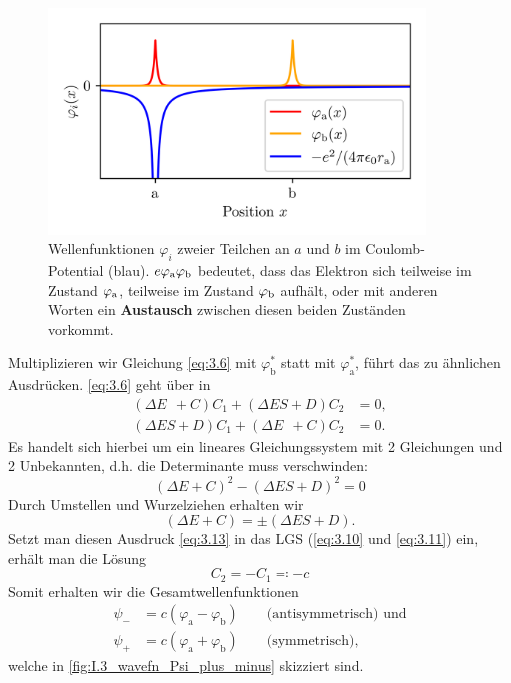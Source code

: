     \begin{figure}[H]
        \centering
        \includegraphics[width=10cm]{figures/vl04/wavefn_exchange_integral.png}   
        \caption{Wellenfunktionen $\varphi_i$ zweier Teilchen an $a$ und $b$ im Coulomb-Potential (blau). $e\varphi_\text a\varphi_\text b$ bedeutet, dass das Elektron sich teilweise im Zustand $\varphi_\text a$, teilweise im Zustand $\varphi_\text b$ aufhält, oder mit anderen Worten ein \textbf{Austausch} zwischen diesen beiden Zuständen vorkommt.}     
        \label{fig:I.3_wavefn_exchange_integral}
    \end{figure}

    Multiplizieren wir Gleichung \eqref{eq:3.6} mit $ \varphi^{*}_\text{b}$ statt mit $ \varphi_\text{a}^{*}$, führt das zu ähnlichen Ausdrücken. 
    \eqref{eq:3.6} geht über in
    \begin{align}
        \label{eq:3.10}
        \left( \Delta E ~~+ C \right) C_1 + \left( \Delta E S + D \right) C_2 &= 0, \\
        \label{eq:3.11}
        \left( \Delta E S + D \right) C_1+ \left( \Delta E ~~+ C \right) C_2 &= 0.
    \end{align}
    Es handelt sich hierbei um ein lineares Gleichungssystem mit 2 Gleichungen und 2 Unbekannten, d.h. die Determinante muss verschwinden:
    \begin{equation}
        \label{eq:3.12}
        \left( \Delta E + C \right) ^2 - \left( \Delta ES + D \right) ^2 = 0
    \end{equation}
    Durch Umstellen und Wurzelziehen erhalten wir
    \begin{equation}
        \label{eq:3.13}
        \left( \Delta E + C  \right) = \pm \left( \Delta ES + D \right).
    \end{equation}
    Setzt man diesen Ausdruck \eqref{eq:3.13} in das LGS \big(\eqref{eq:3.10} und \eqref{eq:3.11}\big) ein, erhält man die Lösung
    \begin{equation}
        \label{eq:3.14}
        C_2 = - C_1 \eqqcolon -c
    \end{equation}
    Somit erhalten wir die Gesamtwellenfunktionen
    \begin{align}
        \label{eq:3.15}
        \psi_{-} &= c\left( \varphi_\mathrm{a} - \varphi_\mathrm{b} \right) \qquad\text{(antisymmetrisch) und} \\
        \label{eq:3.16}
        \psi_{+} &= c\left( \varphi_\mathrm{a} + \varphi_\mathrm{b} \right) \qquad\text{(symmetrisch),}
    \end{align}
    welche in \autoref{fig:I.3_wavefn_Psi_plus_minus} skizziert sind.

